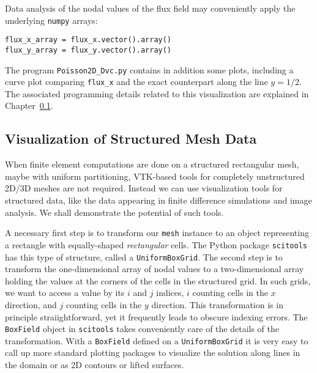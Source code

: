 Data analysis of the nodal values of the flux field may conveniently
apply the underlying {\fontsize{12pt}{12pt}\texttt{numpy}} arrays:
\begin{Verbatim}[fontsize=\fontsize{10pt}{10pt},tabsize=8,baselinestretch=1.05,
fontfamily=tt,xleftmargin=7mm]
flux_x_array = flux_x.vector().array()
flux_y_array = flux_y.vector().array()
\end{Verbatim}
\noindent

The program {\fontsize{12pt}{12pt}\verb!Poisson2D_Dvc.py!} contains in addition some plots,
including a curve plot
comparing {\fontsize{12pt}{12pt}\verb!flux_x!} and the exact counterpart along the line $y=1/2$.
The associated programming details related to this visualization
are explained in Chapter~\ref{langtangen:structviz}.

\subsection{Visualization of Structured Mesh Data}
\label{langtangen:structviz}

When finite element computations are done on 
a structured rectangular mesh, maybe with uniform partitioning,
VTK-based tools for completely unstructured 2D/3D meshes are not required.
Instead we can use visualization
tools for structured data, like the data appearing
in finite difference simulations and image analysis.
We shall demonstrate the potential of such tools. 

A necessary first step
is to transform our {\fontsize{12pt}{12pt}\texttt{mesh}} instance to an object representing a
rectangle with equally-shaped \emph{rectangular} cells.
The Python package {\fontsize{12pt}{12pt}\texttt{scitools}} has this type of structure, called
a {\fontsize{12pt}{12pt}\texttt{UniformBoxGrid}}. The second step is to transform the 
one-dimensional array of nodal
values to a two-dimensional array holding the values at
the corners of the cells in the structured grid. In such
grids, we want to access a value by its $i$ and $j$ indices, $i$ counting
cells in the $x$ direction, and $j$ counting cells in the $y$ direction.
This transformation is in principle straiightforward, yet it frequently leads to
obscure indexing errors. The {\fontsize{12pt}{12pt}\texttt{BoxField}} object in {\fontsize{12pt}{12pt}\texttt{scitools}}
takes conveniently care of the details of the transformation.
With a {\fontsize{12pt}{12pt}\texttt{BoxField}} defined on a {\fontsize{12pt}{12pt}\texttt{UniformBoxGrid}} it is very easy to
call up more standard plotting packages to visualize the solution along
lines in the domain or as 2D contours or lifted surfaces.

